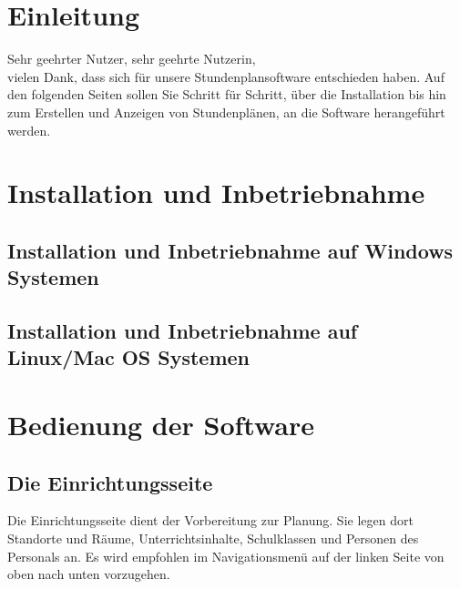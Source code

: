 \documentclass[fontsize=12pt]{scrartcl}
\begin{document}
\section{Einleitung}
Sehr geehrter Nutzer, sehr geehrte Nutzerin,\\
vielen Dank, dass sich für unsere Stundenplansoftware entschieden haben. Auf den folgenden Seiten sollen Sie Schritt für Schritt, über die Installation bis hin zum Erstellen und Anzeigen von Stundenplänen, an die Software herangeführt werden. 

\clearpage 

\section{Installation und Inbetriebnahme}
\subsection{Installation und Inbetriebnahme auf Windows Systemen}
\subsection{Installation und Inbetriebnahme auf Linux/Mac OS Systemen}

\clearpage

\section{Bedienung der Software}

\subsection{Die Einrichtungsseite}
Die Einrichtungsseite dient der Vorbereitung zur Planung. Sie legen dort Standorte und Räume, Unterrichtsinhalte, Schulklassen und Personen des Personals an. Es wird empfohlen im Navigationsmenü auf der linken Seite von oben nach unten vorzugehen.
\end{document}
